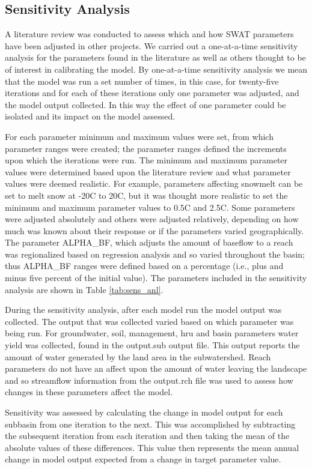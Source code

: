 \subsection{Sensitivity Analysis}
	A literature review was conducted to assess which and how SWAT parameters have been adjusted in other projects. We carried out a one-at-a-time sensitivity analysis for the parameters found in the literature as well as others thought to be of interest in calibrating the model. By one-at-a-time sensitivity analysis we mean that the model was run a set number of times, in this case, for twenty-five iterations and for each of these iterations only one parameter was adjusted, and the model output collected. In this way the effect of one parameter could be isolated and its impact on the model assessed. 

	For each parameter minimum and maximum values were set, from which parameter ranges were created; the parameter ranges defined the increments upon which the iterations were run. The minimum and maximum parameter values were determined based upon the literature review and what parameter values were deemed realistic. For example, parameters affecting snowmelt can be set to melt snow at -20\degree C  to 20\degree C, but it was thought more realistic to set the minimum and maximum parameter values to 0.5\degree C  and 2.5\degree C. Some parameters were adjusted absolutely and others were adjusted relatively, depending on how much was known about their response or if the parameters varied geographically. The parameter ALPHA\_BF, which adjusts the amount of baseflow to a reach was regionalized based on regression analysis and so varied throughout the basin; thus ALPHA\_BF ranges were defined based on a percentage (i.e., plus and minus five percent of the initial value). The parameters included in the sensitivity analysis are shown in Table \ref{tab:sens_anl}. 

	During the sensitivity analysis, after each model run the model output was collected. The output that was collected varied based on which parameter was being run. For groundwater, soil, management, hru and basin parameters water yield was collected, found in the output.sub output file. This output reports the amount of water generated by the land area in the subwatershed. Reach parameters do not have an affect upon the amount of water leaving the landscape and so streamflow information from the output.rch file was used to assess how changes in these parameters affect the model.
	
	Sensitivity was assessed by calculating the change in model output for each subbasin from one iteration to the next. This was accomplished by subtracting the subsequent iteration from each iteration and then taking the mean of the absolute values of these differences. This value then represents the mean annual change in model output expected from a change in target parameter value. 


\pagebreak